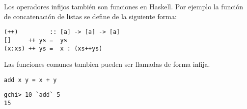 Los operadores infijos también son funciones en Haskell. Por ejemplo la función de concatenación de listas se define de la siguiente forma:

\begin{lstlisting}
(++)         :: [a] -> [a] -> [a]
[]     ++ ys =  ys
(x:xs) ++ ys =  x : (xs++ys)
\end{lstlisting}

Las funciones comunes tambien pueden ser llamadas de forma infija.

\begin{lstlisting}
add x y = x + y
\end{lstlisting}

\begin{lstlisting}
gchi> 10 `add` 5
15
\end{lstlisting}


